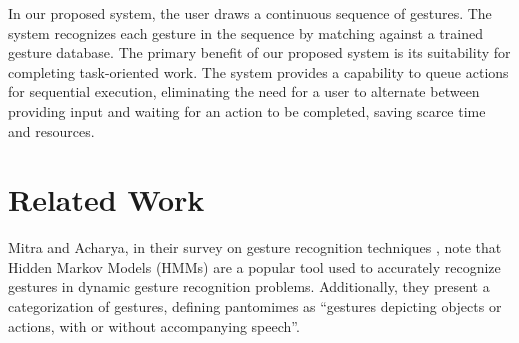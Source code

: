 \documentclass[twoside]{article}
\begin{document}
\begin{multicols}{2}
In our proposed system, the user draws a continuous sequence of gestures. The system recognizes each gesture in the sequence %
by matching against a trained gesture database.  
The primary benefit of our proposed system is its suitability for completing task-oriented work. The system provides a capability to queue 
actions for sequential execution, eliminating the need for a user to alternate
between providing input and waiting for an action to be completed, saving scarce time and resources.
\begin{comment}
We propose a user interface for task-oriented applications that conceptualizes
the user as directing a virtual assistant. In this system, the user performs a
natural mouse-based gesture; the ``assistant'' interprets the continuous gesture
as a linear sequence of actions. We propose that complex gestures consisting of
a sequence of individual gestures provide a more intuitive user interface for
task-oriented systems. The primary benefit is to reclaim the time humans spend
waiting on the system by eliminating the need for a user to alternate between
providing input and waiting for requests actions to complete. As a result,
humans can spend time elsewhere while the system is completing a task.
\end{comment}

\section{Related Work}

Mitra and Acharya, in their survey on gesture recognition techniques \cite{mitra_gesture_2007}, 
note that Hidden Markov Models (HMMs) are a popular tool used to 
accurately recognize gestures in dynamic gesture recognition problems. 
Additionally, they present a categorization of gestures,
defining pantomimes as ``gestures depicting objects or actions, with or without
accompanying speech''. 


\end{multicols}
\end{document}
